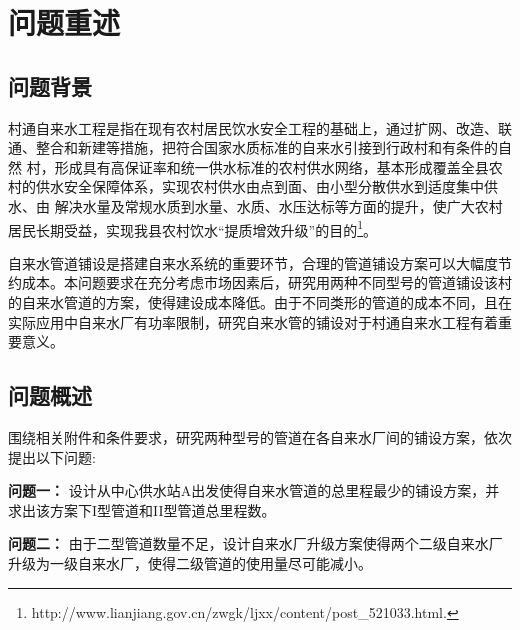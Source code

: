 \documentclass{whutmod}
\begin{document}
\begin{abstract}
		本文的优点为：1. 采用试探法粗略搜索与二分法精细搜索结合的方法，降低了问题的求解难度。2.以凸轮转动角度为固定步长，对不同角速度按照不同精度的时间步长求解，大大提高了求解的精确度。 3.针对智能算法求解精度方面，采用改进的蝙蝠算法，使速度权重系数自适应调整，兼顾局部搜索与全局搜索能力。
		
	\end{abstract}


	\thispagestyle{empty}
	\tableofcontents
	\setcounter{page}{0}                                               
	\newpage	%
	

	
	\section{问题重述}	
		\subsection{问题背景}
	村通自来水工程是指在现有农村居民饮水安全工程的基础上，通过扩网、改造、联通、整合和新建等措施，把符合国家水质标准的自来水引接到行政村和有条件的自然 村，形成具有高保证率和统一供水标准的农村供水网络，基本形成覆盖全县农村的供水安全保障体系，实现农村供水由点到面、由小型分散供水到适度集中供水、由 解决水量及常规水质到水量、水质、水压达标等方面的提升，使广大农村居民长期受益，实现我县农村饮水“提质增效升级”的目的\footnote{\quad http://www.lianjiang.gov.cn/zwgk/ljxx/content/post\_521033.html.}。
	
	自来水管道铺设是搭建自来水系统的重要环节，合理的管道铺设方案可以大幅度节约成本。本问题要求在充分考虑市场因素后，研究用两种不同型号的管道铺设该村的自来水管道的方案，使得建设成本降低。由于不同类形的管道的成本不同，且在实际应用中自来水厂有功率限制，研究自来水管的铺设对于村通自来水工程有着重要意义。
	
		\subsection{问题概述}
		    围绕相关附件和条件要求，研究两种型号的管道在各自来水厂间的铺设方案，依次提出以下问题:
		    
			\textbf{问题一：}
			设计从中心供水站A出发使得自来水管道的总里程最少的铺设方案，并求出该方案下I型管道和II型管道总里程数。
			
			\textbf{问题二：}
			由于二型管道数量不足，设计自来水厂升级方案使得两个二级自来水厂升级为一级自来水厂，使得二级管道的使用量尽可能减小。
			
\end{document}
